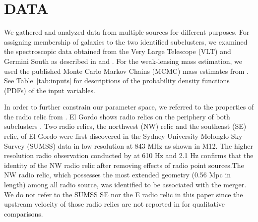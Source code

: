 \section{DATA} 
We gathered and analyzed data from multiple sources for different
purposes. For assigning membership of galaxies to the two identified subclusters, we
examined the spectroscopic data obtained from the Very Large Telescope (VLT) and
Germini South as described in  and \citet{Sifon13}.
For the weak-lensing mass estimation, we used the published
Monte Carlo Markov Chains (MCMC) mass estimates from .
See Table~\ref{tab:inputs} for descriptions of the probability density
functions (PDFs) of the input
variables. \par 
In order to further constrain our parameter space, we referred to the properties of
the radio relic from \citet{L13}. El Gordo shows radio relics on the
periphery of both subclusters . Two radio relics, the
northwest (NW) relic and the southeast (SE) relic, of El Gordo were first
discovered in the Sydney University Molonglo Sky Survey (SUMSS) data in low
resolution at 843 MHz \citep{Mauch03} as shown in M12. The higher
resolution radio observation conducted by \cite{L13} at 610 \mega Hz and
2.1 \giga Hz confirms that the identity of the NW radio relic
after removing effects of radio point sources.The NW radio relic, which
possesses the most extended geometry (0.56 Mpc in length)
among all radio source, was identified to be associated with the
merger. We do not refer to the SUMSS SE nor the E radio relic in this paper
since the upstream velocity of those radio relics are not reported in
\citet{L13} for qualitative comparisons.    
%

